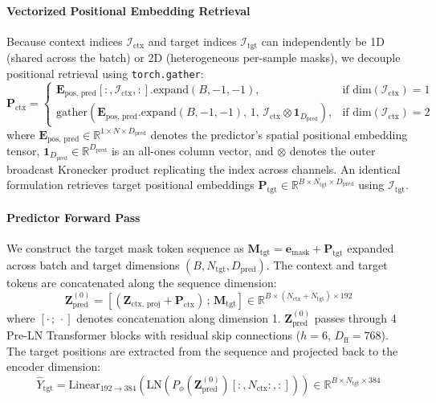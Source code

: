 \documentclass{article}
\begin{document}
\paragraph{Vectorized Positional Embedding Retrieval}
Because context indices $\mathcal{I}_{\text{ctx}}$ and target indices $\mathcal{I}_{\text{tgt}}$ can independently be 1D (shared across the batch) or 2D (heterogeneous per-sample masks), we decouple positional retrieval using \texttt{torch.gather}:
\begin{equation}
    \mathbf{P}_{\text{ctx}} = \begin{cases}
        \mathbf{E}_{\text{pos, pred}}[:, \mathcal{I}_{\text{ctx}}, :].\text{expand}(B, -1, -1), & \text{if } \text{dim}(\mathcal{I}_{\text{ctx}}) = 1 \\
        \text{gather}\left(\mathbf{E}_{\text{pos, pred}}.\text{expand}(B, -1, -1), \, 1, \, \mathcal{I}_{\text{ctx}} \otimes \mathbf{1}_{D_{\text{pred}}}\right), & \text{if } \text{dim}(\mathcal{I}_{\text{ctx}}) = 2
    \end{cases}
\end{equation}
where $\mathbf{E}_{\text{pos, pred}} \in \mathbb{R}^{1 \times N \times D_{\text{pred}}}$ denotes the predictor's spatial positional embedding tensor, $\mathbf{1}_{D_{\text{pred}}} \in \mathbb{R}^{D_{\text{pred}}}$ is an all-ones column vector, and $\otimes$ denotes the outer broadcast Kronecker product replicating the index across channels. An identical formulation retrieves target positional embeddings $\mathbf{P}_{\text{tgt}} \in \mathbb{R}^{B \times N_{\text{tgt}} \times D_{\text{pred}}}$ using $\mathcal{I}_{\text{tgt}}$. 

\paragraph{Predictor Forward Pass}
We construct the target mask token sequence as $\mathbf{M}_{\text{tgt}} = \mathbf{e}_{\text{mask}} + \mathbf{P}_{\text{tgt}}$ expanded across batch and target dimensions $(B, N_{\text{tgt}}, D_{\text{pred}})$. The context and target tokens are concatenated along the sequence dimension:
\begin{equation}
    \mathbf{Z}_{\text{pred}}^{(0)} = \left[ (\mathbf{Z}_{\text{ctx, proj}} + \mathbf{P}_{\text{ctx}}) \,;\, \mathbf{M}_{\text{tgt}} \right] \in \mathbb{R}^{B \times (N_{\text{ctx}} + N_{\text{tgt}}) \times 192}
\end{equation}
where $[ \cdot \,;\, \cdot ]$ denotes concatenation along dimension 1. $\mathbf{Z}_{\text{pred}}^{(0)}$ passes through 4 Pre-LN Transformer blocks with residual skip connections ($h = 6$, $D_{\text{ff}} = 768$). The target positions are extracted from the sequence and projected back to the encoder dimension:
\begin{equation}
    \hat{Y}_{\text{tgt}} = \text{Linear}_{192 \to 384}\left(\text{LN}\left(P_\phi(\mathbf{Z}_{\text{pred}}^{(0)})[:, N_{\text{ctx}}:, :]\right)\right) \in \mathbb{R}^{B \times N_{\text{tgt}} \times 384}
\end{equation}
\end{document}
